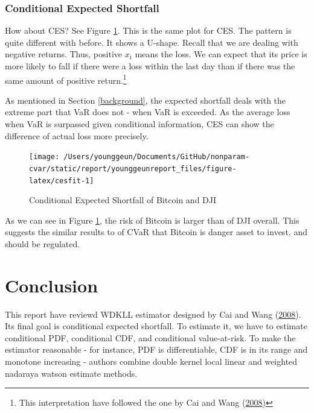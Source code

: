 \documentclass[
]{article}
\theoremstyle{definition}
\theoremstyle{definition}
\theoremstyle{definition}
\theoremstyle{remark}
\begin{document}
\hypertarget{conditional-expected-shortfall}{%
\subsubsection{Conditional Expected Shortfall}\label{conditional-expected-shortfall}}

How about CES? See Figure \ref{fig:cesfit}. This is the same plot for CES. The pattern is quite different with before. It shows a U-shape. Recall that we are dealing with negative returns. Thus, positive \(x_t\) means the loss. We can expect that its price is more likely to fall if there were a loss within the last day than if there was the same amount of positive return.\footnote{This interpretation have followed the one by Cai and Wang (\protect\hyperlink{ref-cai:2008aa}{2008})}

As mentioned in Section \ref{background}, the expected shortfall deals with the extreme part that VaR does not - when VaR is exceeded. As the average loss when VaR is surpassed given conditional information, CES can show the difference of actual loss more precisely.

\begin{figure}[H]

{\centering \texttt{[image: /Users/younggeun/Documents/GitHub/nonparam-cvar/static/report/younggeunreport\_files/figure-latex/cesfit-1]} 

}

\caption{Conditional Expected Shortfall of Bitcoin and DJI}\label{fig:cesfit}
\end{figure}

As we can see in Figure \ref{fig:cesfit}, the risk of Bitcoin is larger than of DJI overall. This suggests the similar results to of CVaR that Bitcoin is danger asset to invest, and should be regulated.

\hypertarget{conclusion}{%
\section{Conclusion}\label{conclusion}}

This report have reviewd WDKLL estimator designed by Cai and Wang (\protect\hyperlink{ref-cai:2008aa}{2008}). Its final goal is conditional expected shortfall. To estimate it, we have to estimate conditional PDF, conditional CDF, and conditional value-at-risk. To make the estimator reasonable - for instance, PDF is differentiable, CDF is in its range and monotone increasing - authors combine double kernel local linear and weighted nadaraya watson estimate methods.
\end{document}
